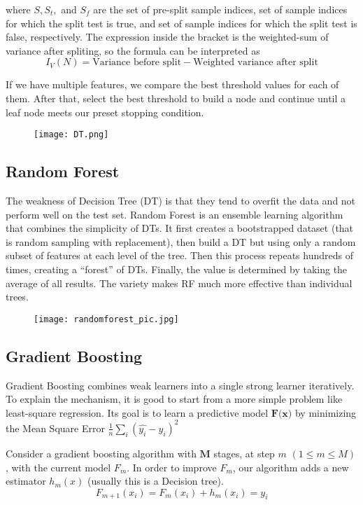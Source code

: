\documentclass[a4paper, 12pt]{article}
\begin{document}
where $S, S_t, $ and $S_f$ are the set of pre-split sample indices, set of sample indices for which the split test is true, and set of sample indices for which the split test is false, respectively. The expression inside the bracket is the weighted-sum of variance after spliting, so the formula can be interpreted as
\begin{equation*}
    I_V(N)=\text{Variance before split} - \text{Weighted variance after split}
\end{equation*}

If we have multiple features, we compare the best threshold values for each of them. After that, select the best threshold to build a node and continue until a leaf node meets our preset stopping condition.

\begin{figure}[tbh]
    \centering
    \texttt{[image: DT.png]}
\end{figure}
\subsection{Random Forest}
The weakness of Decision Tree (DT) is that they tend to overfit the data and not perform well on the test set. Random Forest is an ensemble learning algorithm that combines the simplicity of DTs.
It first creates a bootstrapped dataset (that is random sampling with replacement), then build a DT but using only a random subset of features at each level of the tree. Then this process repeats hundreds of times, creating a “forest” of DTs. Finally, the value is determined by taking the average of all results. The variety makes RF much more effective than individual trees.
\begin{figure}[tbh]
    \centering
    \texttt{[image: randomforest\_pic.jpg]}
\end{figure}
\newpage
\subsection{Gradient Boosting}

Gradient Boosting combines weak learners into a single strong learner iteratively. To explain the mechanism, it is good to start from a more simple problem like least-square regression. Its goal is to learn a predictive model $\textbf{F(x)}$ by minimizing the Mean Square Error $\frac{1}{n}\sum_i (\hat{y_i}-y_i)^2$

Consider a gradient boosting algorithm with $\mathbf{M}$ stages, at step $m$ $(1\leq m \leq M)$, with the current model $F_m$. In order to improve $F_m$, our algorithm adds a new estimator $h_m(x)$ (usually this is a Decision tree).
\begin{equation}
    F_{m+1}(x_i) = F_m(x_i) + h_m(x_i) = y_i
\end{equation}
\end{document}
